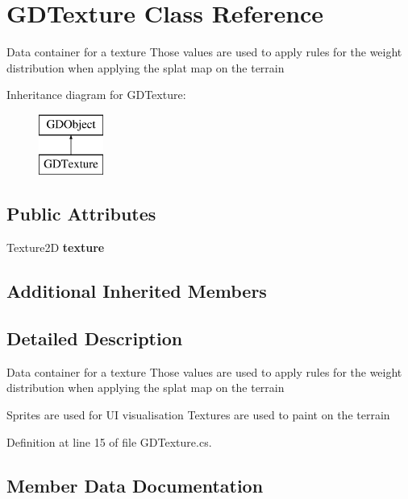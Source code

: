 \section{G\+D\+Texture Class Reference}
\label{class_g_d_texture}


Data container for a texture Those values are used to apply rules for the weight distribution when applying the splat map on the terrain  


Inheritance diagram for G\+D\+Texture\+:\begin{figure}[H]
\begin{center}
\leavevmode
\includegraphics[height=2.000000cm]{class_g_d_texture}
\end{center}
\end{figure}
\subsection*{Public Attributes}
\begin{DoxyCompactItemize}
\item 
Texture2D \textbf{ texture}
\end{DoxyCompactItemize}
\subsection*{Additional Inherited Members}


\subsection{Detailed Description}
Data container for a texture Those values are used to apply rules for the weight distribution when applying the splat map on the terrain 

Sprites are used for UI visualisation Textures are used to paint on the terrain 

Definition at line 15 of file G\+D\+Texture.\+cs.



\subsection{Member Data Documentation}
\mbox{\label{class_g_d_texture_a8519cdfbc4fbc33946963fb4a38b35cc}} 
